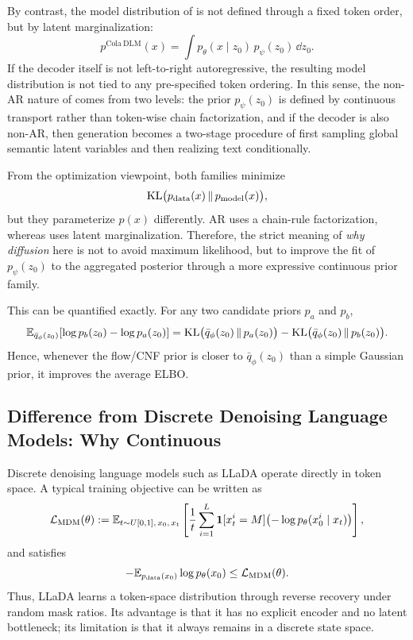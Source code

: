 By contrast, the model distribution of \method is not defined through a fixed token order, but by latent marginalization:
\begin{equation}
p^{\mathrm{Cola\ DLM}}(x)
=
\int p_{\theta}(x\mid z_0)\,p_{\psi}(z_0)\,\dd z_0.
\label{eq:app_ldlm_factorization}
\end{equation}
If the decoder itself is not left-to-right autoregressive, the resulting model distribution is not tied to any pre-specified token ordering. In this sense, the non-AR nature of \method comes from two levels: the prior $p_{\psi}(z_0)$ is defined by continuous transport rather than token-wise chain factorization, and if the decoder is also non-AR, then generation becomes a two-stage procedure of first sampling global semantic latent variables and then realizing text conditionally.

From the optimization viewpoint, both families minimize
\begin{equation}
\mathrm{KL}\bigl(p_{\mathrm{data}}(x)\,\|\,p_{\mathrm{model}}(x)\bigr),
\label{eq:app_common_goal}
\end{equation}
but they parameterize $p(x)$ differently. AR uses a chain-rule factorization, whereas \method uses latent marginalization. Therefore, the strict meaning of \emph{why diffusion} here is not to avoid maximum likelihood, but to improve the fit of $p_{\psi}(z_0)$ to the aggregated posterior through a more expressive continuous prior family.

This can be quantified exactly. For any two candidate priors $p_a$ and $p_b$,
\begin{equation}
\mathbb{E}_{\bar q_{\phi}(z_0)}[\log p_b(z_0)-\log p_a(z_0)]
=
\mathrm{KL}\bigl(\bar q_{\phi}(z_0)\,\|\,p_a(z_0)\bigr)
-
\mathrm{KL}\bigl(\bar q_{\phi}(z_0)\,\|\,p_b(z_0)\bigr).
\label{eq:app_prior_improvement_identity}
\end{equation}
Hence, whenever the flow/CNF prior is closer to $\bar q_{\phi}(z_0)$ than a simple Gaussian prior, it improves the average ELBO.

\subsection{Difference from Discrete Denoising Language Models: Why Continuous}
\label{app:why_continuous}

Discrete denoising language models such as LLaDA operate directly in token space. A typical training objective can be written as
\begin{equation}
\mathcal{L}_{\mathrm{MDM}}(\theta)
:=
\mathbb{E}_{t\sim U[0,1],\,x_0,\,x_t}
\left[
\frac{1}{t}
\sum_{i=1}^{L}
\mathbf 1[x_t^i=M]\bigl(-\log p_{\theta}(x_0^i\mid x_t)\bigr)
\right],
\label{eq:app_llada_obj}
\end{equation}
and satisfies
\begin{equation}
-\mathbb{E}_{p_{\mathrm{data}}(x_0)}\log p_{\theta}(x_0)
\le
\mathcal{L}_{\mathrm{MDM}}(\theta).
\label{eq:app_llada_bound}
\end{equation}
Thus, LLaDA learns a token-space distribution through reverse recovery under random mask ratios. Its advantage is that it has no explicit encoder and no latent bottleneck; its limitation is that it always remains in a discrete state space.

